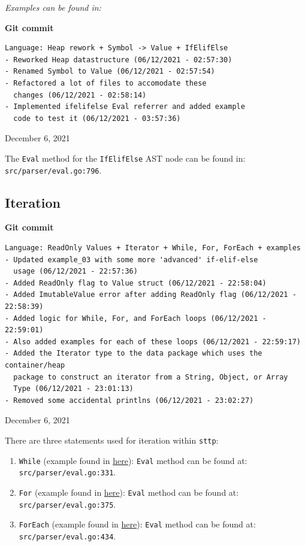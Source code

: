 \documentclass[]{full}
\theoremstyle{definition}
\begin{document}
\textit{Examples can be found in: }

\begin{center}
    \textbf{Git commit}
    \begin{verbatim}
Language: Heap rework + Symbol -> Value + IfElifElse
- Reworked Heap datastructure (06/12/2021 - 02:57:30)
- Renamed Symbol to Value (06/12/2021 - 02:57:54)
- Refactored a lot of files to accomodate these 
  changes (06/12/2021 - 02:58:14)
- Implemented ifelifelse Eval referrer and added example
  code to test it (06/12/2021 - 03:57:36)
    \end{verbatim}
    \vspace{-1em}
    \tiny{December 6, 2021}
\end{center}

The \verb|Eval| method for the \verb|IfElifElse| AST node can be found in: \verb|src/parser/eval.go:796|.

\subsection{Iteration}

\begin{center}
    \textbf{Git commit}
    \begin{verbatim}
Language: ReadOnly Values + Iterator + While, For, ForEach + examples
- Updated example_03 with some more 'advanced' if-elif-else 
  usage (06/12/2021 - 22:57:36)
- Added ReadOnly flag to Value struct (06/12/2021 - 22:58:04)
- Added ImutableValue error after adding ReadOnly flag (06/12/2021 - 22:58:39)
- Added logic for While, For, and ForEach loops (06/12/2021 - 22:59:01)
- Also added examples for each of these loops (06/12/2021 - 22:59:17)
- Added the Iterator type to the data package which uses the container/heap
  package to construct an iterator from a String, Object, or Array
  Type (06/12/2021 - 23:01:13)
- Removed some accidental printlns (06/12/2021 - 23:02:27)
    \end{verbatim}
    \vspace{-1em}
    \tiny{December 6, 2021}
\end{center}

There are three statements used for iteration within \verb|sttp|:

\begin{enumerate}
    \item \verb|While| (example found in \hyperref[appendix:sttp-examples-4]{here}): \verb|Eval| method can be found at: \verb|src/parser/eval.go:331|.
    \item \verb|For| (example found in \hyperref[appendix:sttp-examples-5]{here}): \verb|Eval| method can be found at: \verb|src/parser/eval.go:375|.
    \item \verb|ForEach| (example found in \hyperref[appendix:sttp-examples-6]{here}): \verb|Eval| method can be found at: \verb|src/parser/eval.go:434|.
\end{enumerate}
\end{document}
